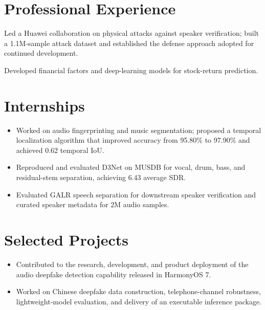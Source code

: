 \documentclass{resume}
\begin{document}
\section{Professional Experience}
Led a Huawei collaboration on physical attacks against speaker verification; built a 1.1M-sample attack dataset and established the defense approach adopted for continued development.

Developed financial factors and deep-learning models for stock-return prediction.

\newpage

\section{Internships}
\begin{itemize}
  \item Worked on audio fingerprinting and music segmentation; proposed a temporal localization algorithm that improved accuracy from 95.80\% to 97.90\% and achieved 0.62 temporal IoU.
\end{itemize}

\begin{itemize}
  \item Reproduced and evaluated D3Net on MUSDB for vocal, drum, bass, and residual-stem separation, achieving 6.43 average SDR.
\end{itemize}

\begin{itemize}
  \item Evaluated GALR speech separation for downstream speaker verification and curated speaker metadata for 2M audio samples.
\end{itemize}

\section{Selected Projects}
\begin{itemize}
  \item Contributed to the research, development, and product deployment of the audio deepfake detection capability released in HarmonyOS 7.
  \item Worked on Chinese deepfake data construction, telephone-channel robustness, lightweight-model evaluation, and delivery of an executable inference package.
\end{itemize}
\end{document}

